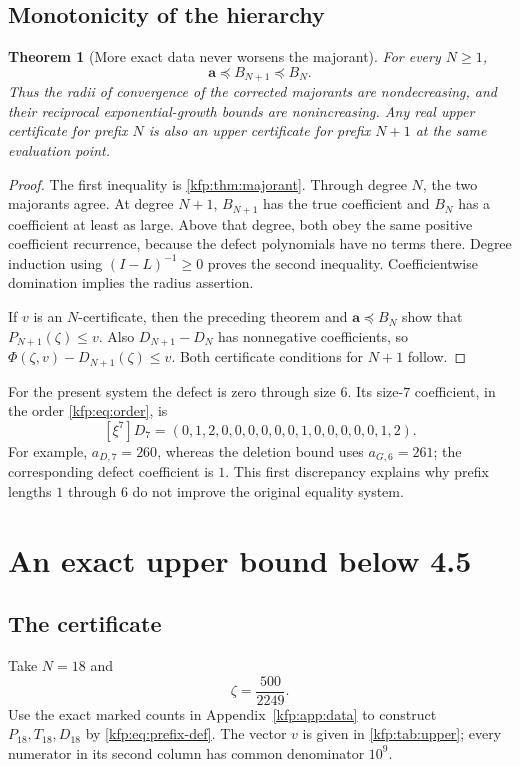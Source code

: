 \documentclass[11pt,a4paper]{article}
\newtheorem{theorem}{Theorem}[section]
\theoremstyle{definition}
\theoremstyle{remark}
\newcommand{\bA}{\boldsymbol a}
\begin{document}
\subsection{Monotonicity of the hierarchy}
\begin{theorem}[More exact data never worsens the majorant]\label{kfp:thm:nested}
For every $N\geq1$,
\[
 \bA\preceq B_{N+1}\preceq B_N.
\]
Thus the radii of convergence of the corrected majorants are nondecreasing,
and their reciprocal exponential-growth bounds are nonincreasing.
Any real upper certificate for prefix $N$ is also an upper certificate for
prefix $N+1$ at the same evaluation point.
\end{theorem}
\begin{proof}
The first inequality is \cref{kfp:thm:majorant}. Through degree $N$, the two
majorants agree. At degree $N+1$, $B_{N+1}$ has the true coefficient and
$B_N$ has a coefficient at least as large. Above that degree, both obey the
same positive coefficient recurrence, because the defect polynomials have
no terms there. Degree induction using $(I-L)^{-1}\geq0$ proves the second
inequality. Coefficientwise domination implies the radius assertion.

If $v$ is an $N$-certificate, then the preceding theorem and
$\bA\preceq B_N$ show that $P_{N+1}(\zeta)\leq v$.
Also $D_{N+1}-D_N$ has nonnegative coefficients, so
$\Phi(\zeta,v)-D_{N+1}(\zeta)\leq v$.
Both certificate conditions for $N+1$ follow.
\end{proof}

For the present system the defect is zero through size $6$. Its size-$7$
coefficient, in the order \eqref{kfp:eq:order}, is
\begin{equation}\label{kfp:eq:first-defect}
 [\xi^7]D_7=(0,1,2,0,0,0,0,0,0,1,0,0,0,0,0,1,2).
\end{equation}
For example, $a_{D,7}=260$, whereas the deletion bound uses
$a_{G,6}=261$; the corresponding defect coefficient is $1$.
This first discrepancy explains why prefix lengths $1$ through $6$ do not
improve the original equality system.

\section{An exact upper bound below 4.5}
\label{kfp:sec:numeric}

\subsection{The certificate}
Take $N=18$ and
\[
 \zeta=\frac{500}{2249}.
\]
Use the exact marked counts in Appendix~\ref{kfp:app:data} to construct
$P_{18},T_{18},D_{18}$ by \eqref{kfp:eq:prefix-def}.
The vector $v$ is given in \cref{kfp:tab:upper}; every numerator in its second
column has common denominator $10^9$.
\end{document}
